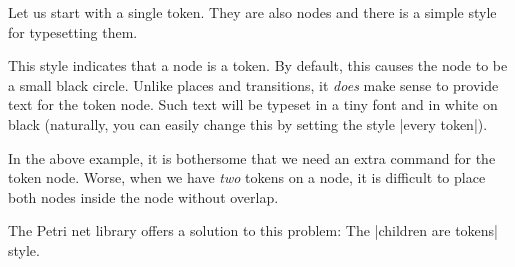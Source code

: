 Let us start with a single token. They are also nodes and there is a
simple style for typesetting them.


\begin{itemize}
  This style indicates that a node is a token. By default, this causes
  the node to be a small black circle. Unlike places and transitions,
  it \emph{does} make sense to provide text for the token node. Such
  text will be typeset in a tiny font and in white on black
  (naturally, you can easily change this by setting the style
  |every token|).
    
\begin{codeexample}[]
\end{codeexample}
\end{itemize}

In the above example, it is bothersome that we need an extra command
for the token node. Worse, when we have \emph{two} tokens on a node,
it is difficult to place both nodes inside the node without overlap.

The Petri net library offers a solution to this problem: The
|children are tokens| style.


